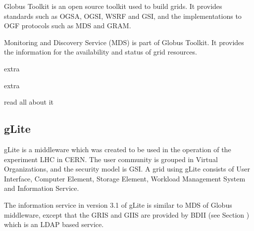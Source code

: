 Globus Toolkit is an open source toolkit used to build grids. It provides
standards such as OGSA, OGSI, WSRF and GSI, and the implementations to OGF
protocols such as MDS and GRAM.


Monitoring and Discovery Service (MDS) is part of Globus Toolkit. It provides
the information for the availability and status of grid resources.

extra

extra

read all about it



\subsection{gLite}

gLite is a middleware which was created to be used in the operation of the
experiment LHC in CERN. The user community is grouped in Virtual Organizations,
and the security model is GSI. A grid using gLite consists of User Interface,
Computer Element, Storage Element, Workload Management System and Information Service.

The information service in version 3.1 of gLite is similar to MDS of Globus
middleware, except that the GRIS and GIIS are provided by BDII (see Section
) which is an LDAP based service.
\newpage




